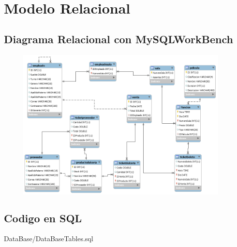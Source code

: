 \documentclass[12pt, fleqn]{report}                             %
\begin{document}
    \clearpage
    \section{Modelo Relacional}

        \subsection{Diagrama Relacional con MySQLWorkBench}

            \begin{figure}[h]
                \centering
                \includegraphics[width=0.95\textwidth]{DataBase/Relations2.png}
            \end{figure}

        \clearpage
        \subsection{Codigo en SQL}

            
            {DataBase/DataBaseTables.sql}
            \clearpage
\end{document}
